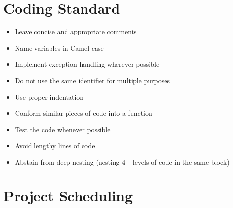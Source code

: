 \documentclass{article}
\begin{document}
\section{Coding Standard}
\begin{itemize}
	\item Leave concise and appropriate comments
	\item Name variables in Camel case
	\item Implement exception handling wherever possible
	\item Do not use the same identifier for multiple purposes
	\item Use proper indentation
	\item Conform similar pieces of code into a function
	\item Test the code whenever possible
	\item Avoid lengthy lines of code
	\item Abstain from deep nesting (nesting 4+ levels of code in the same block)
\end{itemize}
\section{Project Scheduling}
\end{document}
